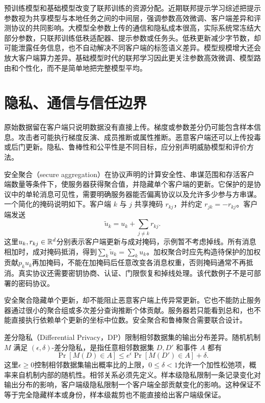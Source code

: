 预训练模型和基础模型改变了联邦训练的资源分配。近期联邦提示学习综述把提示参数视为共享模型与本地任务之间的中间层，强调参数高效微调、客户端差异和评测协议的共同影响\cite{yang2026federatedprompt}。大模型全参数上传的通信和隐私成本很高，实际系统常冻结大部分参数，只联邦训练低秩适配器、提示参数或任务头。低秩更新减少字节数，却可能泄露任务信息，也不自动解决不同客户端的标签语义差异。模型规模增大还会放大客户端算力差异。基础模型时代的联邦学习因此更关注参数高效微调、模型路由和个性化，而不是简单地把完整模型平均。

\section{隐私、通信与信任边界}

原始数据留在客户端只说明数据没有直接上传。梯度或参数差分仍可能包含样本信息。攻击者可能执行梯度反演、成员推断或属性推断。恶意客户端还可以上传投毒或后门更新。隐私、鲁棒性和公平性是不同目标，应分别声明威胁模型和评价方法。

安全聚合（secure aggregation）在协议声明的计算安全性、串谋范围和存活客户端数量等条件下，使服务器获得聚合值，并隐藏单个客户端的更新。它保护的是协议中的单轮消息可见性，需要明确服务器能否偏离协议以及允许多少参与方串谋。一个简化的掩码说明如下。客户端 $k$ 与 $j$ 共享掩码 $r_{kj}$，并约定 $r_{jk}=-r_{kj}$。客户端发送
\begin{equation}
 \widetilde u_k=u_k+\sum_{j\ne k}r_{kj}.
\end{equation}
这里$u_k,r_{kj}\in\mathbb{R}^d$分别表示客户端更新与成对掩码，示例暂不考虑掉线。所有消息相加时，成对掩码抵消，得到$\sum_k\widetilde u_k=\sum_ku_k$。加权聚合时应先构造待保护的加权贡献$p_ku_k$再加掩码，不能在加掩码后任意改变各消息权重，否则掩码通常不再抵消。真实协议还需要密钥协商、认证、门限恢复和掉线处理。该代数例子不是可部署的密码协议。

安全聚合隐藏单个更新，却不能阻止恶意客户端上传异常更新。它也不能防止服务器通过很小的聚合组或多次差分查询推断个体贡献。服务器若只能看到总和，也不能直接执行依赖单个更新的坐标中位数。安全聚合和鲁棒聚合需要联合设计。

差分隐私（Differential Privacy，DP）限制相邻数据集的输出分布差异。随机机制 $M$ 满足 $(\epsilon,\delta)$-差分隐私，是指任意相邻数据集 $D,D'$ 和事件 $A$ 都有
\begin{equation}
 \Pr[M(D)\in A]\leq e^\epsilon\Pr[M(D')\in A]+\delta.
 \label{eq:fed-dp-definition-rewrite}
\end{equation}
这里$\epsilon\geq0$控制相邻数据集输出概率比的上限，$0\leq\delta<1$允许一个加性松弛项，概率来自机制内部的随机性。相邻关系必须先定义。样本级隐私限制一条记录变化对输出分布的影响，客户端级隐私限制一个客户端全部贡献变化的影响。这种保证不等于完全隐藏样本或身份，样本级裁剪也不能直接给出客户端级保证。

